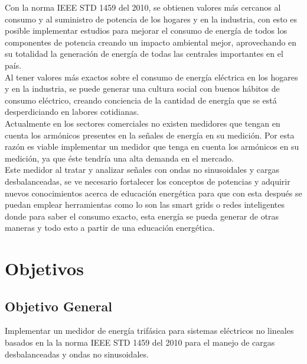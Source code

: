 Con la norma IEEE STD 1459 del 2010, se obtienen valores más cercanos al consumo y al suministro de potencia de los hogares y en la industria, con esto es posible implementar estudios para mejorar el consumo de energía de todos los componentes de potencia creando un impacto ambiental mejor, aprovechando en su totalidad la generación de energía de todas las centrales importantes en el país.\\
 
Al tener valores más exactos sobre el consumo de energía eléctrica en los hogares y en la industria, se puede generar una cultura social con buenos hábitos de consumo eléctrico, creando conciencia de la cantidad de energía que se está desperdiciando en labores cotidianas.\\

Actualmente en los sectores comerciales no existen medidores que tengan en cuenta los armónicos presentes en la señales de energía en su medición. Por esta razón  es viable implementar un medidor que tenga en cuenta los armónicos en su medición, ya que éste tendría una alta demanda en el mercado. \\

Este medidor al tratar y analizar señales con ondas no sinusoidales y cargas desbalanceadas, se ve necesario fortalecer los conceptos de potencias y adquirir nuevos conocimientos acerca de educación energética para que con esta después se puedan emplear herramientas como lo son las smart grids o redes inteligentes donde para saber el consumo exacto, esta energía se pueda generar de otras maneras y todo esto a partir de una educación energética.


\newpage{\cleardoublepage}
\chapter{Objetivos}
\section{Objetivo General}

Implementar un medidor de energía trifásica para sistemas eléctricos no lineales    basados en la la norma IEEE STD 1459 del 2010 para el manejo de cargas desbalanceadas y ondas no sinusoidales.

